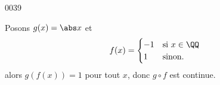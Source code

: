 
\begin{corrige}{0039}

Posons $g(x) = \abs x$ et
\begin{equation*}
  f(x) =
  \begin{cases}
    -1 & \text{si $x \in \QQ$}\\
    1 &  \text{sinon.}\\
  \end{cases}
\end{equation*}
alors $g(f(x)) = 1$ pour tout $x$, donc $g\circ f$ est continue.

\end{corrige}
